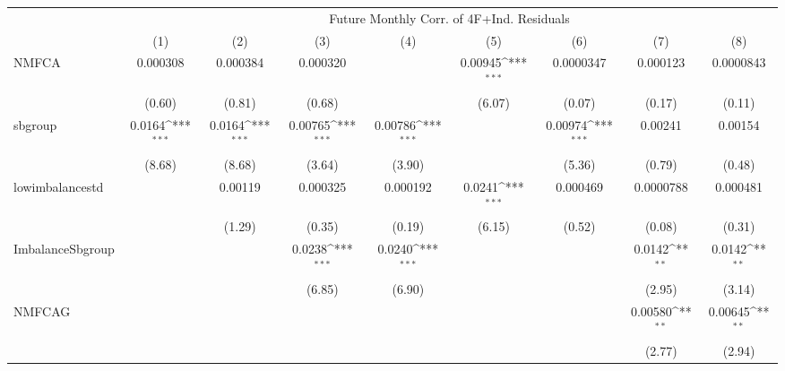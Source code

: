 {
\def\sym#1{\ifmmode^{#1}\else\(^{#1}\)\fi}
\begin{tabular}{l*{8}{c}}
\hline\hline
          &\multicolumn{8}{c}{Future Monthly Corr. of 4F+Ind. Residuals}                                                                                          \\\cmidrule(lr){2-9}
          &\multicolumn{1}{c}{(1)}         &\multicolumn{1}{c}{(2)}         &\multicolumn{1}{c}{(3)}         &\multicolumn{1}{c}{(4)}         &\multicolumn{1}{c}{(5)}         &\multicolumn{1}{c}{(6)}         &\multicolumn{1}{c}{(7)}         &\multicolumn{1}{c}{(8)}         \\
\hline
NMFCA     & 0.000308         & 0.000384         & 0.000320         &                  &  0.00945\sym{***}&0.0000347         & 0.000123         &0.0000843         \\
          &   (0.60)         &   (0.81)         &   (0.68)         &                  &   (6.07)         &   (0.07)         &   (0.17)         &   (0.11)         \\
[1em]
sbgroup   &   0.0164\sym{***}&   0.0164\sym{***}&  0.00765\sym{***}&  0.00786\sym{***}&                  &  0.00974\sym{***}&  0.00241         &  0.00154         \\
          &   (8.68)         &   (8.68)         &   (3.64)         &   (3.90)         &                  &   (5.36)         &   (0.79)         &   (0.48)         \\
[1em]
lowimbalancestd&                  &  0.00119         & 0.000325         & 0.000192         &   0.0241\sym{***}& 0.000469         &0.0000788         & 0.000481         \\
          &                  &   (1.29)         &   (0.35)         &   (0.19)         &   (6.15)         &   (0.52)         &   (0.08)         &   (0.31)         \\
[1em]
ImbalanceSbgroup&                  &                  &   0.0238\sym{***}&   0.0240\sym{***}&                  &                  &   0.0142\sym{**} &   0.0142\sym{**} \\
          &                  &                  &   (6.85)         &   (6.90)         &                  &                  &   (2.95)         &   (3.14)         \\
[1em]
NMFCAG    &                  &                  &                  &                  &                  &                  &  0.00580\sym{**} &  0.00645\sym{**} \\
          &                  &                  &                  &                  &                  &                  &   (2.77)         &   (2.94)         \\

\end{tabular}}
